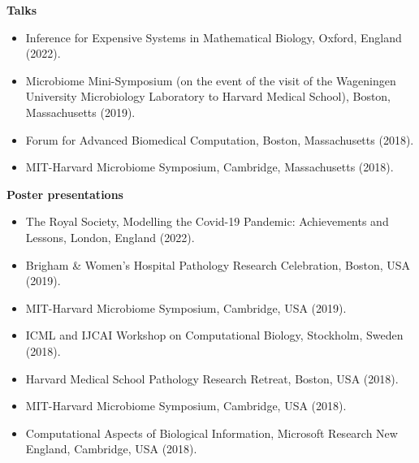 \documentclass[11pt]{article}
\begin{document}
\noindent\textbf{Talks}
\vspace*{.5cm}
\begin{itemize}[leftmargin=*]
\setlength{\itemsep}{4pt}
\setlength{\parskip}{0pt}
\setlength{\parsep}{0pt}
\vspace{-.5cm}
\item Inference for Expensive Systems in Mathematical Biology, Oxford, England (2022).
\item Microbiome Mini-Symposium (on the event of the visit of the Wageningen University Microbiology Laboratory to Harvard Medical School), Boston, Massachusetts (2019).
\item Forum for Advanced Biomedical Computation, Boston, Massachusetts (2018).
\item MIT-Harvard Microbiome Symposium, Cambridge, Massachusetts (2018).
\end{itemize}


\vspace*{.4cm}
\noindent\textbf{Poster presentations}
\vspace*{.5cm}
\begin{itemize}[leftmargin=*]
\setlength{\itemsep}{4pt}
\setlength{\parskip}{0pt}
\setlength{\parsep}{0pt}
\vspace{-.5cm}
\item The Royal Society, Modelling the Covid-19 Pandemic: Achievements and Lessons, London, England (2022).
\item Brigham \& Women's Hospital Pathology Research Celebration, Boston, USA (2019).
\item MIT-Harvard Microbiome Symposium, Cambridge, USA (2019).
\item ICML and IJCAI Workshop on Computational Biology, Stockholm, Sweden (2018).
\item Harvard Medical School Pathology Research Retreat, Boston, USA (2018).
\item MIT-Harvard Microbiome Symposium, Cambridge, USA (2018).
\item Computational Aspects of Biological Information, Microsoft Research New England, Cambridge, USA (2018).
\end{itemize}
\end{document}
